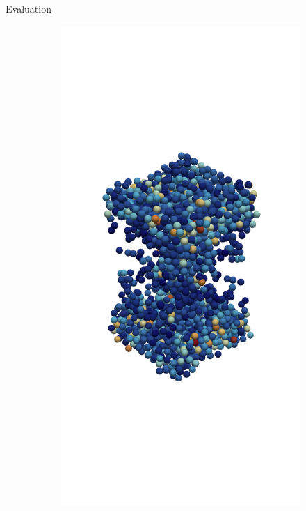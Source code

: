 \begin{frame}[c]{Evaluation}{}
{\begin{figure}[htpb]
\begin{subfigure}[c]{.2\textwidth}
			\vspace{-2cm}
		\end{subfigure}%
		\begin{subfigure}[c]{.2\textwidth}
			\includegraphics[width=\textwidth]{exploding-liquid/render/t3000.png}

\end{subfigure}
\end{figure}}
\end{frame}
